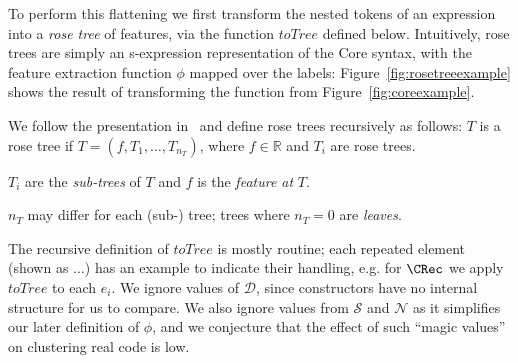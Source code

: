 To perform this flattening we first transform the nested tokens of an expression
into a \emph{rose tree} of features, via the function $toTree$ defined below.
Intuitively, rose trees are simply an s-expression representation of the Core
syntax, with the feature extraction function $\phi$ mapped over the labels:
Figure~\ref{fig:rosetreeexample} shows the result of transforming the 
function from Figure~\ref{fig:coreexample}.

We follow the presentation in~\cite{blundell2012bayesian} and define rose trees
recursively as follows: $T$ is a rose tree if $T = (f, T_1, \dots, T_{n_T})$,
where $f \in \mathbb{R}$ and $T_i$ are rose trees.

$T_i$ are the \emph{sub-trees} of $T$ and $f$ is the \emph{feature at} $T$.

$n_T$ may differ for each (sub-) tree; trees where $n_T = 0$ are \emph{leaves}.

The recursive definition of $toTree$ is mostly routine; each repeated element
(shown as $\dots$) has an example to indicate their handling, e.g. for $\CRec$
we apply $toTree$ to each $e_i$. We ignore values of $\mathcal{D}$, since
constructors have no internal structure for us to compare. We also ignore values
from $\mathcal{S}$ and $\mathcal{N}$ as it simplifies our later definition of
$\phi$, and we conjecture that the effect of such ``magic values'' on clustering
real code is low.

